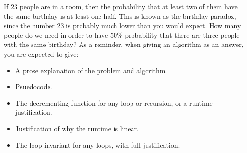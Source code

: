 \documentclass{article}
\author{Group: 7 Names: Peter Gifford, Kyle Brekke, Madison Henson, Ren Wall}
\date{due: 18 October 2019}
\begin{document}
\nextprob
If 23 people are in a room, then the probability that at least two of them have
the same birthday is at least one half.  This is known as the birthday paradox,
since the number 23 is probably much lower than you would expect.  How many
people do we need in order to have 50\% probability that there are three people
with the same birthday?
As a reminder, when giving an algorithm as an answer, you
are expected to give:
\begin{itemize}
    \item A prose explanation of the problem and algorithm.
    \item Psuedocode.
    \item The decrementing function for any loop or recursion, or a runtime
        justification.
    \item Justification of why the runtime is linear.
    \item The loop invariant for any loops, with full justification.
\end{itemize}
   
\end{document}
